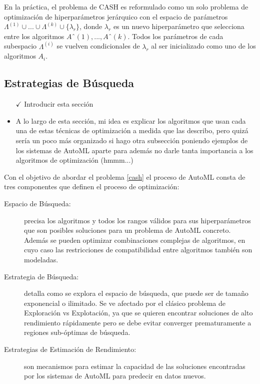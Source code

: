 
En la práctica, el problema de CASH es reformulado como un solo problema de optimización de hiperparámetros jerárquico con el espacio de parámetros $\Lambda^{(1)}\cup ... \cup \Lambda^{(k)} \cup\{\lambda_r\}$, donde $\lambda_r$ es un nuevo hiperparámetro que selecciona entre los algoritmos $Aˆ{(1)}, ..., Aˆ{(k)}$. Todos los parámetros de cada subespacio $\Lambda^{(i)}$ se vuelven condicionales de $\lambda_r$ al ser inicializado como uno de los algoritmos $A_i$.
 
\subsection{Estrategias de Búsqueda}\label{subsec:automl_methods}

\begin{itemize}
	\item[$\checkmark$] Introducir esta sección
	\item A lo largo de esta sección, mi idea es explicar los algoritmos que usan cada una de estas técnicas de optimización a medida que las describo, pero quizá sería un poco más organizado si hago otra subsección poniendo ejemplos de los sistemas de AutoML aparte para además no darle tanta importancia a los algoritmos de optimización (hmmm...)
\end{itemize}

Con el objetivo de abordar el problema \ref{cash} el proceso de AutoML consta de tres componentes que definen el proceso de optimización:

\begin{description}
	\item[Espacio de Búsqueda:] precisa los algoritmos y todos los rangos válidos para sus hiperparámetros que son posibles soluciones para un problema de AutoML concreto. Además se pueden optimizar combinaciones complejas de algoritmos, en cuyo caso las restricciones de compatibilidad entre algoritmos también son modeladas.
	\item[Estrategia de Búsqueda:] detalla como se explora el espacio de búsqueda, que puede ser de tamaño exponencial o ilimitado. Se ve afectado por el clásico problema de Exploración vs Explotación, ya que se quieren encontrar soluciones de alto rendimiento rápidamente pero se debe evitar converger prematuramente a regiones sub-óptimas de búsqueda.
	\item[Estrategias de Estimación de Rendimiento:] son mecanismos para estimar la capacidad de las soluciones encontradas por los sistemas de AutoML para predecir en datos nuevos.
\end{description}

